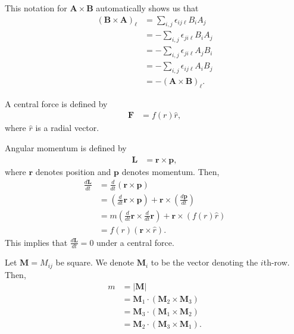 \documentclass[10pt]{mypackage}
\begin{document}
\begin{remark}
  This notation for $\mathbf{A}\times \mathbf{B}$ automatically shows us that
  \begin{align*}
    \left(\mathbf{B}\times \mathbf{A}\right)_{\ell} &= \sum_{i,j}\epsilon_{ij\ell}B_iA_j\\
                                                    &= -\sum_{i,j}\epsilon_{ji\ell}B_iA_j\\
                                                    &= -\sum_{i,j}\epsilon_{ji\ell}A_jB_i\\
                                                    &= -\sum_{i,j}\epsilon_{ij\ell}A_iB_j\tag*{$i,j$ are dummy indices}\\
                                                    &= -\left(\mathbf{A}\times \mathbf{B}\right)_{\ell}.
  \end{align*}
\end{remark}
\begin{example}
  A central force is defined by
  \begin{align*}
    \mathbf{F} &= f(r)\hat{r},
  \end{align*}
  where $\hat{r}$ is a radial vector.\newline

  Angular momentum is defined by
  \begin{align*}
    \mathbf{L} &= \mathbf{r}\times \mathbf{p},
  \end{align*}
  where $\mathbf{r}$ denotes position and $\mathbf{p}$ denotes momentum. Then,
  \begin{align*}
    \frac{d\mathbf{L}}{dt} &= \frac{d}{dt}\left(\mathbf{r}\times \mathbf{p}\right)\\
                           &= \left(\frac{d}{dt}\mathbf{r}\times \mathbf{p}\right) + \mathbf{r}\times \left(\frac{d\mathbf{p}}{dt}\right)\\
                           &= m\left(\frac{d}{dt}\mathbf{r}\times \frac{d}{dt}\mathbf{r}\right) + \mathbf{r}\times \left(f(r)\hat{r}\right)\\
                           &= f(r)\left(\mathbf{r}\times \hat{r}\right).
  \end{align*}
  This implies that $\frac{d\mathbf{L}}{dt} = 0$ under a central force.
\end{example}
\begin{example}[Determinant]
  Let $\mathbf{M} = M_{ij}$ be square. We denote $\mathbf{M}_i$ to be the vector denoting the $i$th-row. Then,
  \begin{align*}
    m &= \left\vert \mathbf{M} \right\vert\\
      &= \mathbf{M}_1\cdot \left(\mathbf{M}_2 \times \mathbf{M}_3\right)\\
      &= \mathbf{M}_3 \cdot \left(\mathbf{M}_1\times \mathbf{M}_2\right)\\
      &= \mathbf{M}_2 \cdot \left(\mathbf{M}_3\times \mathbf{M}_1\right).
  \end{align*}
\end{example}
\end{document}
